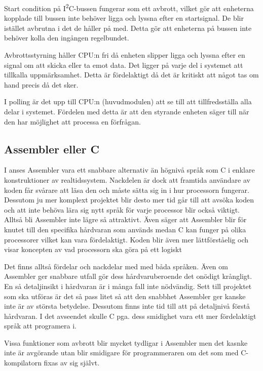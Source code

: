 \documentclass[11pt]{article}
\begin{document}
\begin{flushleft}
Start condition på I\textsuperscript{2}C-bussen fungerar som ett avbrott, vilket gör att enheterna kopplade till bussen inte behöver ligga och lyssna efter en startsignal. De blir istället avbrutna i det de håller på med. Detta gör att enheterna på bussen inte behöver kolla den ingången regelbundet. 


Avbrottsstyrning håller CPU:n fri då enheten slipper ligga och lyssna efter en signal om att skicka eller ta emot data. Det ligger på varje del i systemet att tillkalla uppmärksamhet. Detta är fördelaktigt då det är kritiskt att något tas om hand precis då det sker.

I polling är det upp till CPU:n (huvudmodulen) att se till att tillfredsställa alla delar i systemet. Fördelen med detta är att den styrande enheten säger till när den har möjlighet att processa en förfrågan.

\subsection{Assembler eller C}

I \cite{RWD} anses Assembler vara ett snabbare alternativ än högnivå språk som C i enklare konstruktioner av realtidssystem. Nackdelen är dock att framtida användare av koden får svårare att läsa den och måste sätta sig in i hur processorn fungerar. Dessutom ju mer komplext projektet blir desto mer tid går till att avsöka koden och att inte behöva lära sig nytt språk för varje processor blir också viktigt. Alltså bli Assembler inte lägre så attraktivt. Även \cite{CPM} säger att Assembler blir för knutet till den specifika hårdvaran som används medan C kan funger på olika processorer vilket kan vara fördelaktigt. Koden blir även mer lättförståelig och visar koncepten av vad processorn ska göra på ett logiskt 

Det finns alltså fördelar och nackdelar med med båda språken. Även om Assembler ger snabbare utfall gör dess hårdvaruberoende det onödigt krångligt. En så detaljinsikt i hårdvaran är i många fall inte nödvändig. Sett till projektet som ska utföras är det så pass litet så att den snabbhet Assembler ger kanske inte är av största betydelse. Dessutom finns inte tid till att på detaljnivå förstå hårdvaran. I det avseendet skulle C pga. dess smidighet vara ett mer fördelaktigt språk att programera i. 

Vissa funktioner som avbrott blir mycket tydligar i Assembler men det kasnke inte är avgörande utan blir smidigare för programmeraren om det som med  C- kompilatorn fixas av sig självt. 


\end{flushleft}
\end{document}
